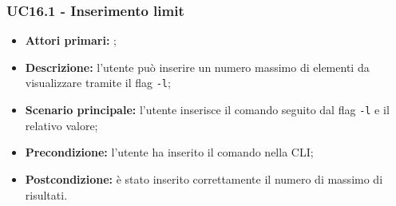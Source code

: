 \subsubsection{UC16.1 - Inserimento limit}
\begin{itemize}
	\item \textbf{Attori primari:} \us{};
	\item \textbf{Descrizione:} l’utente può inserire un numero massimo di elementi da visualizzare tramite il flag \texttt{-l}; 
	\item \textbf{Scenario principale:} l’utente inserisce il comando \history{} seguito dal flag \texttt{-l} e il relativo valore;
	\item \textbf{Precondizione:} l’utente ha inserito il comando \history{} nella CLI;
	\item \textbf{Postcondizione:} è stato inserito correttamente il numero di massimo di risultati.
\end{itemize}